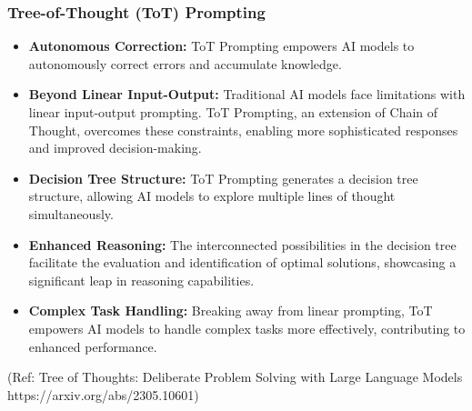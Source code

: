 \begin{frame}[fragile]\frametitle{Tree-of-Thought (ToT) Prompting}

\begin{itemize}
  \item \textbf{Autonomous Correction:} ToT Prompting empowers AI models to autonomously correct errors and accumulate knowledge.
  
  \item \textbf{Beyond Linear Input-Output:} Traditional AI models face limitations with linear input-output prompting. ToT Prompting, an extension of Chain of Thought, overcomes these constraints, enabling more sophisticated responses and improved decision-making.
  
  \item \textbf{Decision Tree Structure:} ToT Prompting generates a decision tree structure, allowing AI models to explore multiple lines of thought simultaneously.
  
  \item \textbf{Enhanced Reasoning:} The interconnected possibilities in the decision tree facilitate the evaluation and identification of optimal solutions, showcasing a significant leap in reasoning capabilities.
  
  \item \textbf{Complex Task Handling:} Breaking away from linear prompting, ToT empowers AI models to handle complex tasks more effectively, contributing to enhanced performance.
  
  
\end{itemize}


{\tiny (Ref: Tree of Thoughts: Deliberate Problem Solving with Large Language Models https://arxiv.org/abs/2305.10601)}



\end{frame}


